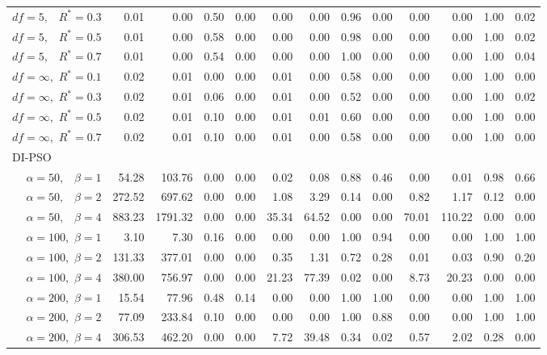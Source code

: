 \documentclass[12pt]{article}
\begin{document}
\begin{table}[ht]
{\begin{tabular}{r|rrrr|rrrr|rrrr}
  $df = 5,\enspace$ $R^* =0.3$ & 0.01 & 0.00 & 0.50 & 0.00 & 0.00 & 0.00 & 0.96 & 0.00 & 0.00 & 0.00 & 1.00 & 0.02 \\ 
  $df = 5,\enspace$ $R^* =0.5$ & 0.01 & 0.00 & 0.58 & 0.00 & 0.00 & 0.00 & 0.98 & 0.00 & 0.00 & 0.00 & 1.00 & 0.02 \\ 
  $df = 5,\enspace$ $R^* =0.7$ & 0.01 & 0.00 & 0.54 & 0.00 & 0.00 & 0.00 & 1.00 & 0.00 & 0.00 & 0.00 & 1.00 & 0.04 \\ 
  $df = \infty,$ $R^* =0.1$ & 0.02 & 0.01 & 0.00 & 0.00 & 0.01 & 0.00 & 0.58 & 0.00 & 0.00 & 0.00 & 1.00 & 0.00 \\ 
  $df = \infty,$ $R^* =0.3$ & 0.02 & 0.01 & 0.06 & 0.00 & 0.01 & 0.00 & 0.52 & 0.00 & 0.00 & 0.00 & 1.00 & 0.02 \\ 
  $df = \infty,$ $R^* =0.5$ & 0.02 & 0.01 & 0.10 & 0.00 & 0.01 & 0.01 & 0.60 & 0.00 & 0.00 & 0.00 & 1.00 & 0.00 \\ 
  $df = \infty,$ $R^* =0.7$ & 0.02 & 0.01 & 0.10 & 0.00 & 0.01 & 0.00 & 0.58 & 0.00 & 0.00 & 0.00 & 1.00 & 0.00 \\ 
\hline
\multicolumn{1}{l|}{DI-PSO} &&&&&&&&&&&&\\
  $\alpha = 50,\enspace$ $\beta =1$ & 54.28 & 103.76 & 0.00 & 0.00 & 0.02 & 0.08 & 0.88 & 0.46 & 0.00 & 0.01 & 0.98 & 0.66 \\ 
  $\alpha = 50,\enspace$ $\beta =2$ & 272.52 & 697.62 & 0.00 & 0.00 & 1.08 & 3.29 & 0.14 & 0.00 & 0.82 & 1.17 & 0.12 & 0.00 \\ 
  $\alpha = 50,\enspace$ $\beta =4$ & 883.23 & 1791.32 & 0.00 & 0.00 & 35.34 & 64.52 & 0.00 & 0.00 & 70.01 & 110.22 & 0.00 & 0.00 \\ 
  $\alpha = 100,$ $\beta =1$ & 3.10 & 7.30 & 0.16 & 0.00 & 0.00 & 0.00 & 1.00 & 0.94 & 0.00 & 0.00 & 1.00 & 1.00 \\ 
  $\alpha = 100,$ $\beta =2$ & 131.33 & 377.01 & 0.00 & 0.00 & 0.35 & 1.31 & 0.72 & 0.28 & 0.01 & 0.03 & 0.90 & 0.20 \\ 
  $\alpha = 100,$ $\beta =4$ & 380.00 & 756.97 & 0.00 & 0.00 & 21.23 & 77.39 & 0.02 & 0.00 & 8.73 & 20.23 & 0.00 & 0.00 \\ 
  $\alpha = 200,$ $\beta =1$ & 15.54 & 77.96 & 0.48 & 0.14 & 0.00 & 0.00 & 1.00 & 1.00 & 0.00 & 0.00 & 1.00 & 1.00 \\ 
  $\alpha = 200,$ $\beta =2$ & 77.09 & 233.84 & 0.10 & 0.00 & 0.00 & 0.00 & 1.00 & 0.88 & 0.00 & 0.00 & 1.00 & 1.00 \\ 
  $\alpha = 200,$ $\beta =4$ & 306.53 & 462.20 & 0.00 & 0.00 & 7.72 & 39.48 & 0.34 & 0.02 & 0.57 & 2.02 & 0.28 & 0.00 \\ 

\end{tabular}}
\end{table}
\end{document}
